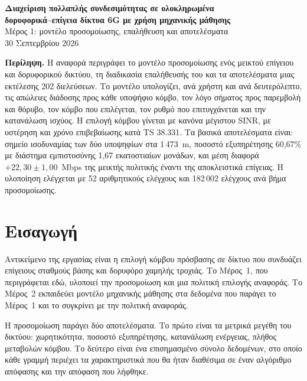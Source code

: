 \documentclass[11pt,a4paper]{article}
\begin{document}
\begin{center}
{\large\bfseries Διαχείριση πολλαπλής συνδεσιμότητας σε ολοκληρωμένα\\[2pt]
δορυφορικά–επίγεια δίκτυα 6G με χρήση μηχανικής μάθησης}\\[6pt]
{\normalsize Μέρος 1: μοντέλο προσομοίωσης, επαλήθευση και αποτελέσματα}\\[8pt]
{\small 30 Σεπτεμβρίου 2026}
\end{center}

\vspace{4pt}

\noindent\textbf{Περίληψη.} Η αναφορά περιγράφει το μοντέλο προσομοίωσης ενός
μεικτού επίγειου και δορυφορικού δικτύου, τη διαδικασία επαλήθευσής του και τα
αποτελέσματα μιας εκτέλεσης 202 διελεύσεων. Το μοντέλο υπολογίζει, ανά χρήστη
και ανά δευτερόλεπτο, τις απώλειες διάδοσης προς κάθε υποψήφιο κόμβο, τον λόγο
σήματος προς παρεμβολή και θόρυβο, τον κόμβο που επιλέγεται, τον ρυθμό που
επιτυγχάνεται και την κατανάλωση ισχύος. Η επιλογή κόμβου γίνεται με κανόνα
μέγιστου SINR, με υστέρηση και χρόνο επιβεβαίωσης κατά TS 38.331. Τα βασικά
αποτελέσματα είναι: σημείο ισοδυναμίας των δύο υποψηφίων στα 1\,473~m, ποσοστό
εξυπηρέτησης 60,67\% με διάστημα εμπιστοσύνης 1,67 εκατοστιαίων μονάδων, και
μέση διαφορά $+22{,}30 \pm 1{,}00$~Mbps της μεικτής πολιτικής έναντι της
αποκλειστικά επίγειας. Η υλοποίηση ελέγχεται με 52 αριθμητικούς ελέγχους και
182\,002 ελέγχους ανά βήμα προσομοίωσης.

\vspace{6pt}

\section{Εισαγωγή}

Αντικείμενο της εργασίας είναι η επιλογή κόμβου πρόσβασης σε δίκτυο που
συνδυάζει επίγειους σταθμούς βάσης και δορυφόρο χαμηλής τροχιάς. Το Μέρος~1,
που περιγράφεται εδώ, υλοποιεί την προσομοίωση και μια πολιτική επιλογής
αναφοράς. Το Μέρος~2 εκπαιδεύει μοντέλο μηχανικής μάθησης στα δεδομένα που
παράγει το Μέρος~1 και το συγκρίνει με την πολιτική αναφοράς.

Η προσομοίωση παράγει δύο αποτελέσματα. Το πρώτο είναι τα μετρικά μεγέθη του
δικτύου: χωρητικότητα, ποσοστό εξυπηρέτησης, κατανάλωση ενέργειας, πλήθος
μεταβολών κόμβου. Το δεύτερο είναι ένα επισημασμένο σύνολο δεδομένων, στο οποίο
κάθε γραμμή περιέχει τα χαρακτηριστικά που θα ήταν διαθέσιμα σε έναν αλγόριθμο
απόφασης και την απόφαση που λήφθηκε.
\end{document}
